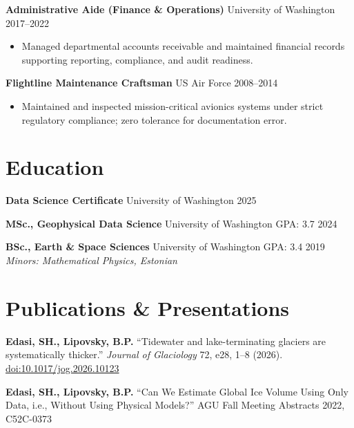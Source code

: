 \documentclass[11pt,a4paper]{article}
\begin{document}
\vspace{0.2cm}
\noindent
\textbf{Administrative Aide (Finance \& Operations)} \hfill University of Washington \hfill 2017--2022
\begin{itemize}
    \item Managed departmental accounts receivable and maintained financial records supporting reporting, compliance, and audit readiness.
\end{itemize}

\vspace{0.2cm}
\noindent
\textbf{Flightline Maintenance Craftsman} \hfill US Air Force \hfill 2008--2014
\begin{itemize}
    \item Maintained and inspected mission-critical avionics systems under strict regulatory compliance; zero tolerance for documentation error.
\end{itemize}

\section*{Education}

\noindent
\textbf{Data Science Certificate} \hfill University of Washington \hfill 2025

\vspace{0.1cm}
\noindent
\textbf{MSc., Geophysical Data Science} \hfill University of Washington \hfill GPA: 3.7 \hfill 2024

\vspace{0.1cm}
\noindent
\textbf{BSc., Earth \& Space Sciences} \hfill University of Washington \hfill GPA: 3.4 \hfill 2019 \\
\textit{Minors: Mathematical Physics, Estonian}

\section*{Publications \& Presentations}

\noindent
\textbf{Edasi, SH., Lipovsky, B.P.} ``Tidewater and lake-terminating glaciers are systematically thicker.'' \textit{Journal of Glaciology} 72, e28, 1--8 (2026). \href{https://doi.org/10.1017/jog.2026.10123}{doi:10.1017/jog.2026.10123}

\noindent
\textbf{Edasi, SH., Lipovsky, B.P.} ``Can We Estimate Global Ice Volume Using Only Data, i.e., Without Using Physical Models?'' AGU Fall Meeting Abstracts 2022, C52C-0373
\end{document}
